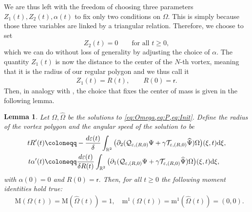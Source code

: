 \documentclass[11pt,reqno,a4paper]{amsart}
\def\dd{{\rm d}}
\def\eps{\varepsilon}
\def\de{{\partial}}
\def\RR {\mathbb{R}}
\newcommand{\cQ}{\mathcal{Q}}
\newcommand{\cT}{\mathcal{T}}
\newcommand{\mrm}{\mathrm{m}}
\newcommand{\mrM}{\mathrm{M}}
\newcommand{\1}{\mathbbm{1}}
\newtheorem{lemma}[proposition]{Lemma}
\theoremstyle{definition}
\theoremstyle{definition}
\numberwithin{equation}{section}
\begin{document}
We are thus left with the freedom of choosing three parameters $Z_1(t),Z_2(t),\alpha(t)$ to fix only two conditions on $\Omega$. This is simply because those three variables are linked by a triangular relation. Therefore, we choose to set
\begin{equation}
    Z_2(t)=0 \qquad \text{for all } t\geq0,
\end{equation}
which we can do without loss of generality by adjusting the choice of $\alpha$.
The quantity $Z_1(t)$ is now  the distance to the center of the $N$-th vortex, meaning that it is the radius of our regular polygon and we thus call it
\begin{align}
\label{eq:choiceZ1}
    Z_1(t)=R(t), \qquad R(0)=\mathsf{r}.
\end{align}
Then, in analogy with \cite{dolce2024long,GaSring}, the choice that fixes the center of mass is given in the following lemma.
\begin{lemma}\label{lem:alpha'gives_moments}
    Let $\Omega,\widehat{\Omega}$ be the solutions to \cref{eq:Omega,eq:P,eq:Init}. Define the radius of the vortex polygon and the angular speed of the solution to be
    \begin{align}
    \label{def:R} tR'(t)&\coloneqq-\frac{d\eps(t)}{\delta }\int_{\RR^2}\big(\de_2(\cQ_{\eps,(R,0)}\Psi+\gamma \cT_{\eps,(R,0)}\widehat{\Psi})\Omega\big)(\xi,t)\dd \xi,\\
    \label{def:alpha}
t\alpha'(t)&\coloneqq\frac{d\eps(t)}{\delta R(t)}\int_{\RR^2}\big(\de_1(\cQ_{\eps,(R,0)}\Psi+\gamma \cT_{\eps,(R,0)}\widehat{\Psi})\Omega\big)(\xi,t)\dd \xi,
    \end{align}
    with $\alpha(0)=0$ and  $R(0)=\mathsf{r}$.
    Then, for all $t\geq 0$ the following moment identities hold true:
    \begin{align}
&\mrM(\Omega(t))=\mrM(\widehat{\Omega}(t))=1, \quad \mrm^1(\Omega(t))=\mrm^1(\widehat{\Omega}(t))=(0,0).
\end{align}
\end{lemma}
\end{document}

